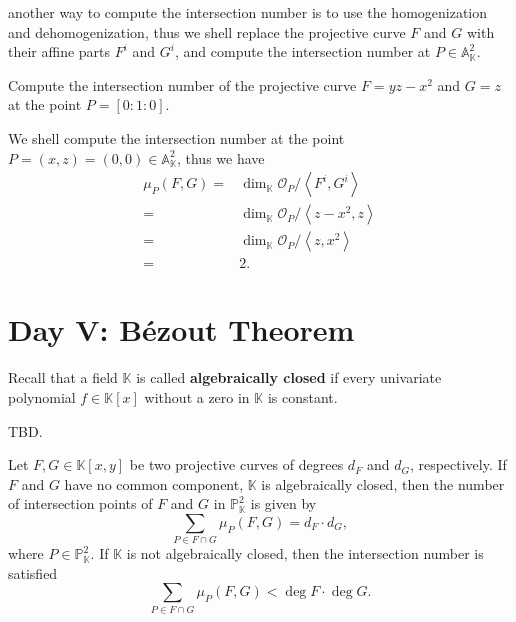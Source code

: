 \documentclass[10pt]{article}
\begin{document}
another way to compute the intersection number is to use the homogenization and dehomogenization, thus we shell replace the projective curve $ F$ and $ G$ with their affine parts $ F^{i}$ and $ G^{i}$, and compute the intersection number at $ P \in \mathbb{A}^{2}_{\mathbb{K}}$.
\begin{example}
  Compute the intersection number of the projective curve $ F = yz - x^{2}$ and $ G = z$ at the point $ P = [0:1:0]$.
\end{example}
\begin{solution}
  We shell compute the intersection number at the point $ P = (x,z) = (0,0) \in \mathbb{A}_{\mathbb{K}}^{2}$, thus we have
  \begin{equation*}
    \begin{aligned}
      \mu_{P}(F,G) = & \dim_{\mathbb{K}} \mathcal{O}_{P} / \left< F^{i}, G^{i} \right>\\
      = & \dim_{\mathbb{K}} \mathcal{O}_{P} / \left< z - x^{2}, z \right>\\
      = & \dim_{\mathbb{K}} \mathcal{O}_{P} / \left< z, x^{2} \right>\\
      = & 2.
    \end{aligned}
  \end{equation*}
\end{solution}

\section{Day V: B\'ezout Theorem}

Recall that a field $ \mathbb{K}$ is called \textbf{algebraically closed} if every univariate polynomial $f \in \mathbb{K}[x]$ without a zero in $\mathbb{K}$ is constant.

\begin{theorem}
  TBD.
\end{theorem}

\begin{theorem}
  Let $ F, G \in \mathbb{K}[x,y]$ be two projective curves of degrees $ d_F$ and $ d_G$, respectively. If $ F$ and $ G$ have no common component, $ \mathbb{K}$ is algebraically closed, then the number of intersection points of $ F$ and $ G$ in $\mathbb{P}^2_{\mathbb{K}}$ is given by
  \begin{equation*}
    \sum_{P \in F \cap G} \mu_{P}(F,G) = d_F \cdot d_G,
  \end{equation*}
  where $ P \in \mathbb{P}^{2}_{\mathbb{K}}$. If $ \mathbb{K}$ is not algebraically closed, then the intersection number is satisfied
  \begin{equation*}
    \sum_{P \in F \cap G} \mu_{P}(F,G) < \deg F \cdot \deg G.
  \end{equation*}
\end{theorem}
\end{document}
